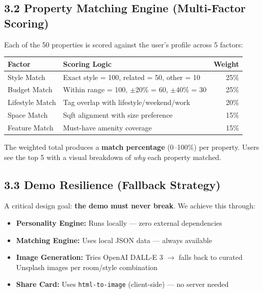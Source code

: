 \documentclass[11pt,a4paper]{article}
\begin{document}
\subsection{3.2 Property Matching Engine (Multi-Factor Scoring)}

Each of the 50 properties is scored against the user's profile across 5 factors:

\begin{table}[h]
\centering
\begin{tabular}{@{}llr@{}}
\toprule
\textbf{Factor} & \textbf{Scoring Logic} & \textbf{Weight} \\
\midrule
Style Match & Exact style = 100, related = 50, other = 10 & 25\% \\
Budget Match & Within range = 100, $\pm$20\% = 60, $\pm$40\% = 30 & 25\% \\
Lifestyle Match & Tag overlap with lifestyle/weekend/work & 20\% \\
Space Match & Sqft alignment with size preference & 15\% \\
Feature Match & Must-have amenity coverage & 15\% \\
\bottomrule
\end{tabular}
\end{table}

\noindent The weighted total produces a \textbf{match percentage} (0--100\%) per property. Users see the top 5 with a visual breakdown of \textit{why} each property matched.

\subsection{3.3 Demo Resilience (Fallback Strategy)}

A critical design goal: \textbf{the demo must never break}. We achieve this through:

\begin{itemize}[nosep]
    \item \textbf{Personality Engine:} Runs locally --- zero external dependencies
    \item \textbf{Matching Engine:} Uses local JSON data --- always available
    \item \textbf{Image Generation:} Tries OpenAI DALL-E 3 $\rightarrow$ falls back to curated Unsplash images per room/style combination
    \item \textbf{Share Card:} Uses \texttt{html-to-image} (client-side) --- no server needed
\end{itemize}
\end{document}
